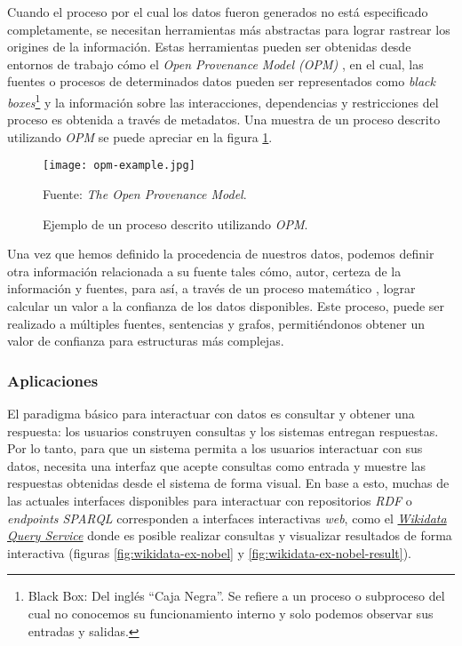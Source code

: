 Cuando el proceso por el cual los datos fueron generados no está especificado
completamente, se necesitan herramientas más abstractas para lograr rastrear los
origines de la información. Estas herramientas pueden ser obtenidas desde
entornos de trabajo cómo el \textit{Open Provenance Model (OPM)}
\cite{moreau2008open}, en el cual, las fuentes o procesos de determinados datos
pueden ser representados como \textit{black boxes}\footnote{Black Box: Del
inglés ``Caja Negra''. Se refiere a un proceso o subproceso del cual no
conocemos su funcionamiento interno y solo podemos observar sus entradas y
salidas.} y la información sobre las interacciones, dependencias y
restricciones del proceso es obtenida a través de metadatos. Una muestra de un
proceso descrito utilizando \textit{OPM} se puede apreciar en la figura
\ref{fig:opm-example}.

\begin{figure}
    \centering
    \texttt{[image: opm-example.jpg]}
    \caption{Ejemplo de un proceso descrito utilizando \textit{OPM}.} Fuente:
    \textit{The Open Provenance Model}.
    \label{fig:opm-example}
\end{figure}

Una vez que hemos definido la procedencia de nuestros datos, podemos definir
otra información relacionada a su fuente tales cómo, autor, certeza de la
información y fuentes, para así, a través de un proceso matemático
\cite{dividino2009provenance}, lograr calcular un valor a la confianza de los
datos disponibles. Este proceso, puede ser realizado a múltiples fuentes,
sentencias y grafos, permitiéndonos obtener un valor de confianza para
estructuras más complejas.

\subsubsection{Aplicaciones}
\label{sec:aplicaciones}

El paradigma básico para interactuar con datos es consultar y obtener una
respuesta: los usuarios construyen consultas y los sistemas entregan respuestas.
Por lo tanto, para que un sistema permita a los usuarios interactuar con sus
datos, necesita una interfaz que acepte consultas como entrada y muestre las
respuestas obtenidas desde el sistema de forma visual. En base a esto, muchas de
las actuales interfaces disponibles para interactuar con repositorios
\textit{RDF} o \textit{endpoints SPARQL} corresponden a interfaces interactivas
\textit{web}, como el \href{https://query.wikidata.org}{\textit{Wikidata Query
Service}} donde es posible realizar consultas y visualizar resultados de forma
interactiva (figuras \ref{fig:wikidata-ex-nobel} y
\ref{fig:wikidata-ex-nobel-result}).

